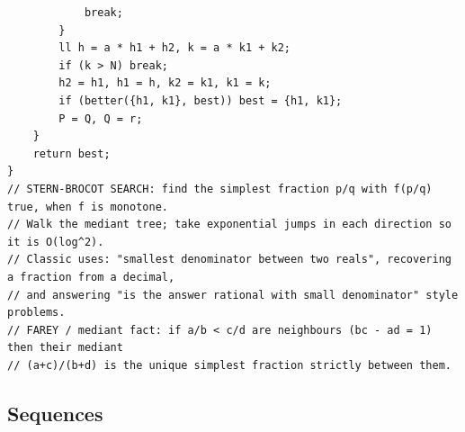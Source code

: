 \documentclass[9pt,a4paper,twocolumn]{extarticle}
\begin{document}
\begin{lstlisting}
            break;
        }
        ll h = a * h1 + h2, k = a * k1 + k2;
        if (k > N) break;
        h2 = h1, h1 = h, k2 = k1, k1 = k;
        if (better({h1, k1}, best)) best = {h1, k1};
        P = Q, Q = r;
    }
    return best;
}
// STERN-BROCOT SEARCH: find the simplest fraction p/q with f(p/q) true, when f is monotone.
// Walk the mediant tree; take exponential jumps in each direction so it is O(log^2).
// Classic uses: "smallest denominator between two reals", recovering a fraction from a decimal,
// and answering "is the answer rational with small denominator" style problems.
// FAREY / mediant fact: if a/b < c/d are neighbours (bc - ad = 1) then their mediant
// (a+c)/(b+d) is the unique simplest fraction strictly between them.
\end{lstlisting}

\subsection{Sequences}

\filbreak
\end{document}
